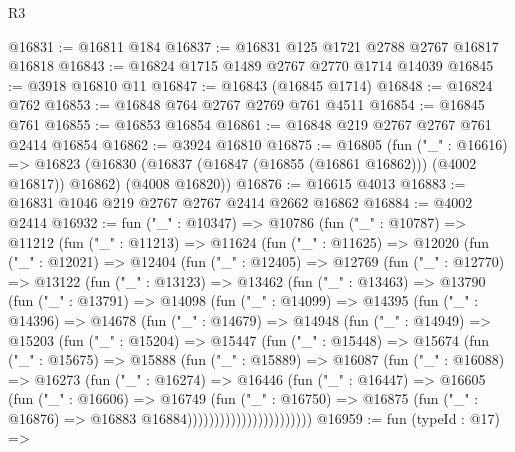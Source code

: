 \begin{lexlean}{R3}
\begin{coremodule}
@16831 := @16811 @184
@16837 := @16831 @125 @1721 @2788 @2767 @16817 @16818
@16843 := @16824 @1715 @1489 @2767 @2770 @1714 @14039
@16845 := @3918 @16810 @11
@16847 := @16843 (@16845 @1714)
@16848 := @16824 @762
@16853 := @16848 @764 @2767 @2769 @761 @4511
@16854 := @16845 @761
@16855 := @16853 @16854
@16861 := @16848 @219 @2767 @2767 @761 @2414 @16854
@16862 := @3924 @16810
@16875 := @16805
    (fun ("_" : @16616) =>
    @16823 (@16830 (@16837 (@16847 (@16855 (@16861 @16862))) (@4002 @16817)) @16862) (@4008 @16820))
@16876 := @16615 @4013
@16883 := @16831 @1046 @219 @2767 @2767 @2414 @2662 @16862
@16884 := @4002 @2414
@16932 := fun ("_" : @10347) =>
  @10786
    (fun ("_" : @10787) =>
    @11212
      (fun ("_" : @11213) =>
      @11624
        (fun ("_" : @11625) =>
        @12020
          (fun ("_" : @12021) =>
          @12404
            (fun ("_" : @12405) =>
            @12769
              (fun ("_" : @12770) =>
              @13122
                (fun ("_" : @13123) =>
                @13462
                  (fun ("_" : @13463) =>
                  @13790
                    (fun ("_" : @13791) =>
                    @14098
                      (fun ("_" : @14099) =>
                      @14395
                        (fun ("_" : @14396) =>
                        @14678
                          (fun ("_" : @14679) =>
                          @14948
                            (fun ("_" : @14949) =>
                            @15203
                              (fun ("_" : @15204) =>
                              @15447
                                (fun ("_" : @15448) =>
                                @15674
                                  (fun ("_" : @15675) =>
                                  @15888
                                    (fun ("_" : @15889) =>
                                    @16087
                                      (fun ("_" : @16088) =>
                                      @16273
                                        (fun ("_" : @16274) =>
                                        @16446
                                          (fun ("_" : @16447) =>
                                          @16605
                                            (fun ("_" : @16606) =>
                                            @16749
                                              (fun ("_" : @16750) =>
                                              @16875
                                                (fun ("_" : @16876) =>
                                                @16883 @16884)))))))))))))))))))))))
@16959 := fun (typeId : @17) =>

\end{coremodule}
\end{lexlean}

